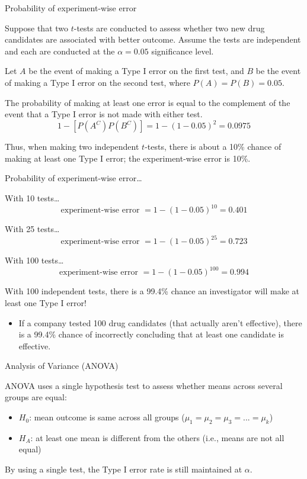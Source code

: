\documentclass[
  ignorenonframetext,
  aspectratio=169]{beamer}
\providecommand{\tightlist}{%
  \setlength{\itemsep}{0pt}\setlength{\parskip}{0pt}}
\begin{document}
\begin{frame}{Probability of experiment-wise error}
\protect\hypertarget{probability-of-experiment-wise-error}{}
\small

Suppose that two \(t\)-tests are conducted to assess whether two new
drug candidates are associated with better outcome. Assume the tests are
independent and each are conducted at the \(\alpha = 0.05\) significance
level.

Let \(A\) be the event of making a Type I error on the first test, and
\(B\) be the event of making a Type I error on the second test, where
\(P(A) = P(B) = 0.05\).

The probability of making at least one error is equal to the complement
of the event that a Type I error is not made with either test.
\[1 - [P(A^C) P(B^C) ] = 1 - (1 - 0.05)^2 = 0.0975 \]

Thus, when making two independent \(t\)-tests, there is about a 10\%
chance of making at least one Type I error; the experiment-wise error is
10\%.
\end{frame}

\begin{frame}{Probability of experiment-wise error\ldots{}}
\protect\hypertarget{probability-of-experiment-wise-error-1}{}
\small

With 10 tests\ldots{}
\[\text{experiment-wise error }=  1 - (1 - 0.05)^{10} = 0.401\]

With 25 tests\ldots{}
\[\text{experiment-wise error }=  1 - (1 - 0.05)^{25} = 0.723\]

With 100 tests\ldots{}
\[\text{experiment-wise error }=  1 - (1 - 0.05)^{100} = 0.994\]

With 100 independent tests, there is a 99.4\% chance an investigator
will make at least one Type I error!

\begin{itemize}
\tightlist
\item
  If a company tested 100 drug candidates (that actually aren't
  effective), there is a 99.4\% chance of incorrectly concluding that at
  least one candidate is effective.
\end{itemize}
\end{frame}

\begin{frame}{Analysis of Variance (ANOVA)}
\protect\hypertarget{analysis-of-variance-anova}{}
\small

ANOVA uses a single hypothesis test to assess whether means across
several groups are equal:

\begin{itemize}
\item
  \(H_0\): mean outcome is same across all groups
  (\(\mu_1 = \mu_2 = \mu_3 = ... = \mu_k\))
\item
  \(H_A\): at least one mean is different from the others (i.e., means
  are not all equal)
\end{itemize}

By using a single test, the Type I error rate is still maintained at
\(\alpha\).
\end{frame}
\end{document}
